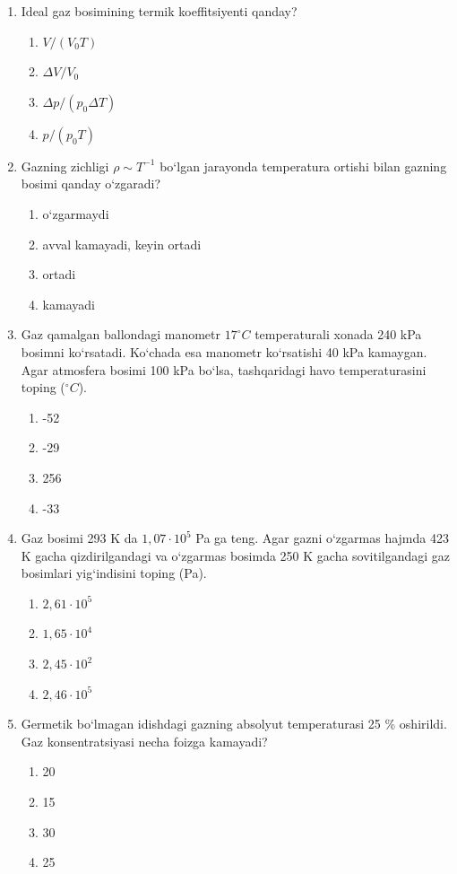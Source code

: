 \begin{enumerate}
\item Ideal gaz bosimining termik koeffitsiyenti qanday?
\begin{enumerate}[label=\Alph*)]
\item $V / (V_0 T)$
\item $\Delta V / V_0$
\item $\Delta p / (p_0 \Delta T)$
\item $p / (p_0 T)$
\end{enumerate}

\item Gazning zichligi $\rho \sim T^{-1}$ bo‘lgan jarayonda temperatura ortishi bilan gazning bosimi qanday o‘zgaradi?
\begin{enumerate}[label=\Alph*)]
\item o‘zgarmaydi
\item avval kamayadi, keyin ortadi
\item ortadi
\item kamayadi
\end{enumerate}

\item Gaz qamalgan ballondagi manometr $17^\circ C$ temperaturali xonada 240 kPa bosimni ko‘rsatadi. Ko‘chada esa manometr ko‘rsatishi 40 kPa kamaygan. Agar atmosfera bosimi 100 kPa bo‘lsa, tashqaridagi havo temperaturasini toping ($^\circ C$).
\begin{enumerate}[label=\Alph*)]
\item -52
\item -29
\item 256
\item -33
\end{enumerate}

\item Gaz bosimi 293 K da $1,07 \cdot 10^5$ Pa ga teng. Agar gazni o‘zgarmas hajmda 423 K gacha qizdirilgandagi va o‘zgarmas bosimda 250 K gacha sovitilgandagi gaz bosimlari yig‘indisini toping (Pa).
\begin{enumerate}[label=\Alph*)]
\item $2,61 \cdot 10^5$
\item $1,65 \cdot 10^4$
\item $2,45 \cdot 10^2$
\item $2,46 \cdot 10^5$
\end{enumerate}

\item Germetik bo‘lmagan idishdagi gazning absolyut temperaturasi 25 \% oshirildi. Gaz konsentratsiyasi necha foizga kamayadi?
\begin{enumerate}[label=\Alph*)]
\item 20
\item 15
\item 30
\item 25
\end{enumerate}


\end{enumerate}
